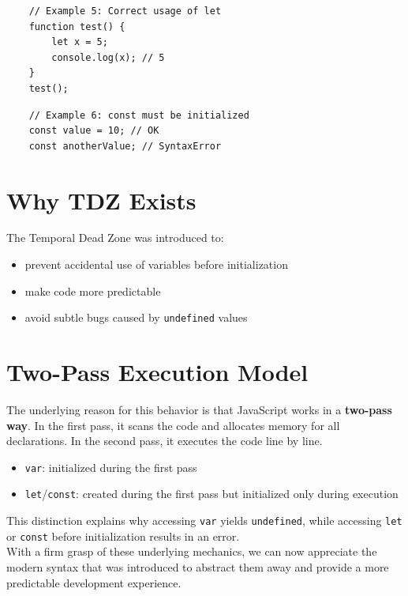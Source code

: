 \documentclass{scrbook}
\begin{document}
\begin{lstlisting}
    // Example 5: Correct usage of let
    function test() {
        let x = 5;
        console.log(x); // 5
    }
    test();
\end{lstlisting}

\begin{lstlisting}
    // Example 6: const must be initialized
    const value = 10; // OK
    const anotherValue; // SyntaxError
\end{lstlisting}

\section{Why TDZ Exists}

The Temporal Dead Zone was introduced to:
\begin{itemize}
    \item prevent accidental use of variables before initialization
    \item make code more predictable
    \item avoid subtle bugs caused by \texttt{undefined} values
\end{itemize}

\section{Two-Pass Execution Model}

The underlying reason for this behavior is that JavaScript works in a \textbf{two-pass way}. In the first pass, it scans the code and allocates memory for all declarations. In the second pass, it executes the code line by line.

\begin{itemize}
    \item \texttt{var}: initialized during the first pass
    \item \texttt{let}/\texttt{const}: created during the first pass but initialized only during execution
\end{itemize}

This distinction explains why accessing \texttt{var} yields \texttt{undefined}, while accessing \texttt{let} or \texttt{const} before initialization results in an error.\\

With a firm grasp of these underlying mechanics, we can now appreciate the modern syntax that was introduced to abstract them away and provide a more predictable development experience.
\end{document}
